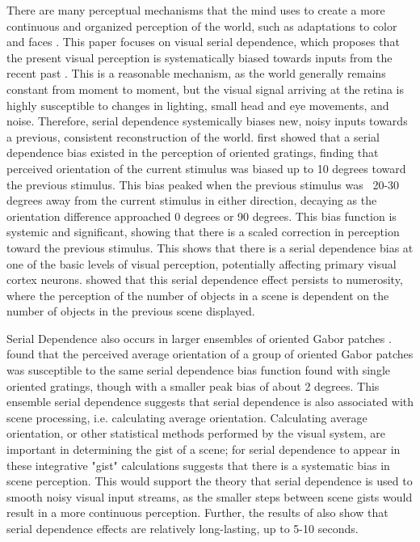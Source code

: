 \documentclass[../main.tex]{subfiles}
\begin{document}
There are many perceptual mechanisms that the mind uses to create a more continuous and organized perception of the world, such as adaptations to color \citep{webster_mollon_1997} and faces \citep{webster_macleod_2011}. This paper focuses on visual serial dependence, which proposes that the present visual perception is systematically biased towards inputs from the recent past \citep{fischer_whitney_2014, Cicchini7867}. This is a reasonable mechanism, as the world generally remains constant from moment to moment, but the visual signal arriving at the retina is highly susceptible to changes in lighting, small head and eye movements, and noise. Therefore, serial dependence systemically biases new, noisy inputs towards a previous, consistent reconstruction of the world. \cite{fischer_whitney_2014} first showed that a serial dependence bias existed in the perception of oriented gratings, finding that perceived orientation of the current stimulus was biased up to 10 degrees toward the previous stimulus. This bias peaked when the previous stimulus was ~20-30 degrees away from the current stimulus in either direction, decaying as the orientation difference approached 0 degrees or 90 degrees. This bias function is systemic and significant, showing that there is a scaled correction in perception toward the previous stimulus. This shows that there is a serial dependence bias at one of the basic levels of visual perception, potentially affecting primary visual cortex neurons. \cite{Cicchini7867} showed that this serial dependence effect persists to numerosity, where the perception of the number of objects in a scene is dependent on the number of objects in the previous scene displayed.

Serial Dependence also occurs in larger ensembles of oriented Gabor patches \citep{Manassi}. \cite{Manassi} found that the perceived average orientation of a group of oriented Gabor patches was susceptible to the same serial dependence bias function found with single oriented gratings, though with a smaller peak bias of about 2 degrees. This ensemble serial dependence suggests that serial dependence is also associated with scene processing, i.e. calculating average orientation. Calculating average orientation, or other statistical methods performed by the visual system, are important in determining the gist of a scene; for serial dependence to appear in these integrative "gist" calculations suggests that there is a systematic bias in scene perception. This would support the theory that serial dependence is used to smooth noisy visual input streams, as the smaller steps between scene gists would result in a more continuous perception. Further, the results of \cite{Manassi} also show that serial dependence effects are relatively long-lasting, up to 5-10 seconds.
\end{document}
